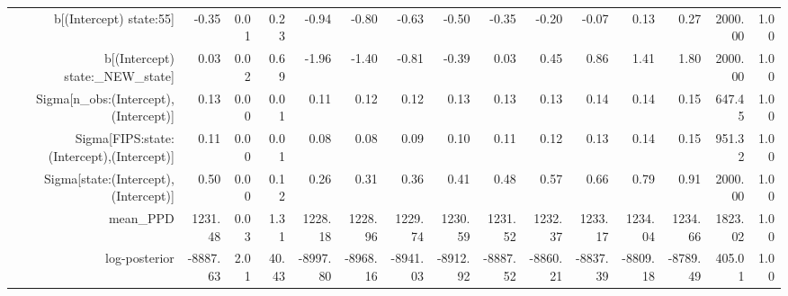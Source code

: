 \begin{table}[ht]
\begin{tabular}{rrrrrrrrrrrrrrr}
  b[(Intercept) state:55] & -0.35 & 0.01 & 0.23 & -0.94 & -0.80 & -0.63 & -0.50 & -0.35 & -0.20 & -0.07 & 0.13 & 0.27 & 2000.00 & 1.00 \\ 
  b[(Intercept) state:\_NEW\_state] & 0.03 & 0.02 & 0.69 & -1.96 & -1.40 & -0.81 & -0.39 & 0.03 & 0.45 & 0.86 & 1.41 & 1.80 & 2000.00 & 1.00 \\ 
  Sigma[n\_obs:(Intercept),(Intercept)] & 0.13 & 0.00 & 0.01 & 0.11 & 0.12 & 0.12 & 0.13 & 0.13 & 0.13 & 0.14 & 0.14 & 0.15 & 647.45 & 1.00 \\ 
  Sigma[FIPS:state:(Intercept),(Intercept)] & 0.11 & 0.00 & 0.01 & 0.08 & 0.08 & 0.09 & 0.10 & 0.11 & 0.12 & 0.13 & 0.14 & 0.15 & 951.32 & 1.00 \\ 
  Sigma[state:(Intercept),(Intercept)] & 0.50 & 0.00 & 0.12 & 0.26 & 0.31 & 0.36 & 0.41 & 0.48 & 0.57 & 0.66 & 0.79 & 0.91 & 2000.00 & 1.00 \\ 
  mean\_PPD & 1231.48 & 0.03 & 1.31 & 1228.18 & 1228.96 & 1229.74 & 1230.59 & 1231.52 & 1232.37 & 1233.17 & 1234.04 & 1234.66 & 1823.02 & 1.00 \\ 
  log-posterior & -8887.63 & 2.01 & 40.43 & -8997.80 & -8968.16 & -8941.03 & -8912.92 & -8887.52 & -8860.21 & -8837.39 & -8809.18 & -8789.49 & 405.01 & 1.00 \\ 
   \hline
\end{tabular}
\end{table}
